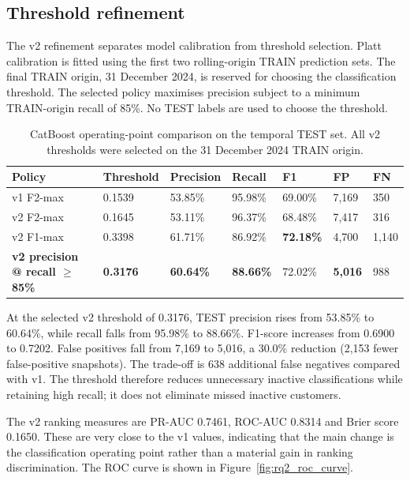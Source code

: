 \subsection{Threshold refinement}

The v2 refinement separates model calibration from threshold selection.
Platt calibration is fitted using the first two rolling-origin TRAIN
prediction sets. The final TRAIN origin, 31 December 2024, is reserved for
choosing the classification threshold. The selected policy maximises
precision subject to a minimum TRAIN-origin recall of 85\%. No TEST labels
are used to choose the threshold.

\begin{table}[H]
\centering
\small
\caption{CatBoost operating-point comparison on the temporal TEST set. All v2 thresholds were selected on the 31 December 2024 TRAIN origin.}
\label{tab:rq2_threshold_refinement}
\begin{tabularx}{\textwidth}{|Y|C{0.10\textwidth}|C{0.12\textwidth}|C{0.12\textwidth}|C{0.09\textwidth}|C{0.10\textwidth}|C{0.10\textwidth}|}
\hline
\textbf{Policy} & \textbf{Threshold} & \textbf{Precision} & \textbf{Recall} & \textbf{F1} & \textbf{FP} & \textbf{FN} \\
\hline
v1 F2-max & 0.1539 & 53.85\% & 95.98\% & 69.00\% & 7,169 & 350 \\
\hline
v2 F2-max & 0.1645 & 53.11\% & 96.37\% & 68.48\% & 7,417 & 316 \\
\hline
v2 F1-max & 0.3398 & 61.71\% & 86.92\% & \textbf{72.18\%} & 4,700 & 1,140 \\
\hline
\textbf{v2 precision @ recall $\geq$ 85\%} & \textbf{0.3176} & \textbf{60.64\%} & \textbf{88.66\%} & 72.02\% & \textbf{5,016} & 988 \\
\hline
\end{tabularx}
\end{table}

At the selected v2 threshold of 0.3176, TEST precision rises from 53.85\%
to 60.64\%, while recall falls from 95.98\% to 88.66\%. F1-score increases
from 0.6900 to 0.7202. False positives fall from 7,169 to 5,016, a
30.0\% reduction (2,153 fewer false-positive snapshots). The trade-off is
638 additional false negatives compared with v1. The threshold therefore
reduces unnecessary inactive classifications while retaining high recall;
it does not eliminate missed inactive customers.

The v2 ranking measures are PR-AUC 0.7461, ROC-AUC 0.8314 and Brier score
0.1650. These are very close to the v1 values, indicating that the main
change is the classification operating point rather than a material gain
in ranking discrimination. The ROC curve is shown in
Figure~\ref{fig:rq2_roc_curve}.

